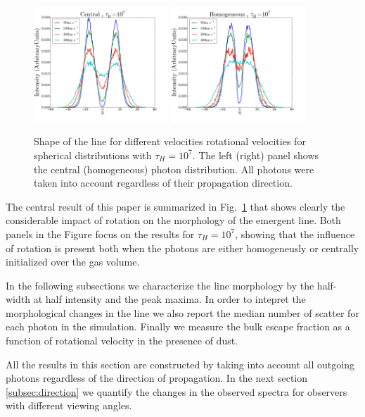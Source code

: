 \documentclass[usenatbib]{mn2e}
\newcommand{\ly}{{\ifmmode{{\rm Ly}\alpha~}\else{Ly$\alpha$~}\fi}}
\begin{document}
\begin{figure}
  \includegraphics[width=0.45\textwidth]{SpectraDifVelocitiesCentral.png}
  \includegraphics[width=0.45\textwidth]{SpectraDifVelocitiesHOM.png}
\caption{Shape of the \ly line for
    different velocities rotational velocities for spherical
    distributions with $\tau_{H}=10^{7}$. The left (right) panel shows
    the central    (homogeneous) photon distribution. All photons were
    taken into     account regardless of their propagation
    direction.    \label{fig:differentvelocities}}  
\end{figure}


The central result of this paper is summarized in
Fig.~\ref{fig:differentvelocities} that shows clearly the considerable
impact of rotation on the morphology of the emergent \ly line. Both
panels in the Figure focus on the results for $\tau_{H}=10^{7}$,
showing that the influence of rotation is present both when the
photons are either homogeneusly or centrally initialized over the gas
volume. 

In the following subsections we characterize the line morphology by
the half-width at half intensity and the peak maxima. In order to
intepret the morphological changes in the line we also report the
median number of scatter for each \ly photon in the
simulation. Finally we measure the bulk escape fraction as a function
of rotational velocity in the presence of dust.


All the results in this section are constructed by taking into
account all outgoing photons regardless of the direction of
propagation. In the next section \ref{subsec:direction} we quantify 
the changes in the observed spectra for observers with different
viewing angles. 
\end{document}
